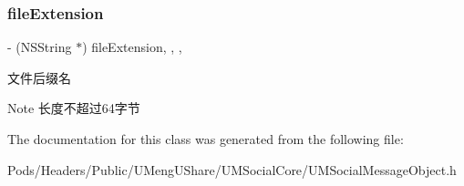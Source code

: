 \subsubsection{\texorpdfstring{file\+Extension}{fileExtension}}
{\footnotesize\ttfamily -\/ (N\+S\+String $\ast$) file\+Extension\hspace{0.3cm}{\ttfamily [read]}, {\ttfamily [write]}, {\ttfamily [nonatomic]}, {\ttfamily [retain]}}

文件后缀名 \begin{DoxyNote}{Note}
长度不超过64字节 
\end{DoxyNote}


The documentation for this class was generated from the following file\+:\begin{DoxyCompactItemize}
\item 
Pods/\+Headers/\+Public/\+U\+Meng\+U\+Share/\+U\+M\+Social\+Core/U\+M\+Social\+Message\+Object.\+h\end{DoxyCompactItemize}
